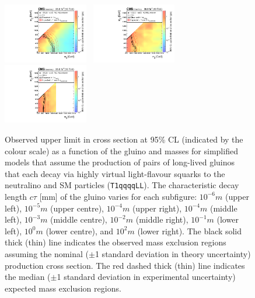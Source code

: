 \begin{figure}[!t]
  \includegraphics[width=0.33\textwidth]{Figures/T1qqqqLL_ctau-1000_XSEC}~
  \includegraphics[width=0.33\textwidth]{Figures/T1qqqqLL_ctau-10000_XSEC}~
  \includegraphics[width=0.33\textwidth]{Figures/T1qqqqLL_ctau-100000_XSEC}\\
  \caption{Observed upper limit in cross section at 95\% CL (indicated
    by the colour scale) as a function of the gluino and \chiz masses
    for simplified models that assume the production of pairs of
    long-lived gluinos that each decay via highly virtual
    light-flavour squarks to the neutralino and SM particles
    (\texttt{T1qqqqLL}). The characteristic decay length $c\tau$ [mm]
    of the gluino varies for each subfigure: 
    $10^{-6}\unit{m}$ (upper left),
    $10^{-5}\unit{m}$ (upper centre),
    $10^{-4}\unit{m}$ (upper right),
    $10^{-4}\unit{m}$ (middle left),
    $10^{-3}\unit{m}$ (middle centre),
    $10^{-2}\unit{m}$ (middle right),
    $10^{-1}\unit{m}$ (lower left),
    $10^{0}\unit{m}$ (lower centre), and
    $10^{2}\unit{m}$ (lower right). 
    The black solid thick (thin) line indicates the observed mass
    exclusion regions assuming the nominal ($\pm$1 standard deviation
    in theory uncertainty) production cross section. The red dashed
    thick (thin) line indicates the median ($\pm$1 standard deviation
    in experimental uncertainty) expected mass exclusion regions. 
  }
  \label{fig:longlived} 
\end{figure} 


